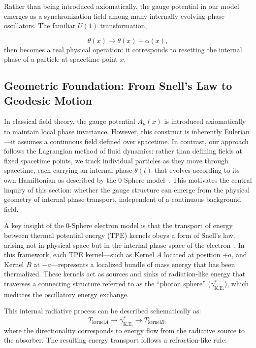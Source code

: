 \documentclass[%
 reprint,
 amsmath,amssymb,
 aps,
]{revtex4-1}
\numberwithin{equation}{section}%
\begin{document}
Rather than being introduced axiomatically, the gauge potential in our model emerges as a synchronization field among many internally evolving phase oscillators. The familiar $U(1)$ transformation,

\begin{equation}
\theta(x) \to \theta(x) + \alpha(x),
\end{equation}
then becomes a real physical operation: it corresponds to resetting the internal phase of a particle at spacetime point $x$.


\subsection{Geometric Foundation: From Snell's Law to Geodesic Motion}

In classical field theory, the gauge potential $A_\mu(x)$ is introduced axiomatically to maintain local phase invariance. However, this construct is inherently Eulerian—it assumes a continuous field defined over spacetime. In contrast, our approach follows the Lagrangian method of fluid dynamics: rather than defining fields at fixed spacetime points, we track individual particles as they move through spacetime, each carrying an internal phase $\theta(t)$ that evolves according to its own Hamiltonian as described by the 0-Sphere model~\cite{hanamura2024quantum,hanamura2023}. This motivates the central inquiry of this section: whether the gauge structure can emerge from the physical geometry of internal phase transport, independent of a continuous background field.

A key insight of the 0-Sphere electron model is that the transport of energy between thermal potential energy (TPE) kernels obeys a form of Snell’s law, arising not in physical space but in the internal phase space of the electron~\cite{hanamura2024quantum}. In this framework, each TPE kernel—such as Kernel $A$ located at position $+a$, and Kernel $B$ at $-a$—represents a localized bundle of mass energy that has been thermalized. These kernels act as sources and sinks of radiation-like energy that traverses a connecting structure referred to as the “photon sphere” ($\gamma^*_{\mathrm{K.E.}}$), which mediates the oscillatory energy exchange.

This internal radiative process can be described schematically as:
\begin{equation}
T_{\mathrm{kernel}A} \rightarrow \gamma^*_{\mathrm{K.E.}} \rightarrow T_{\mathrm{kernel}B},
\end{equation}
where the directionality corresponds to energy flow from the radiative source to the absorber. The resulting energy transport follows a refraction-like rule:
\end{document}
